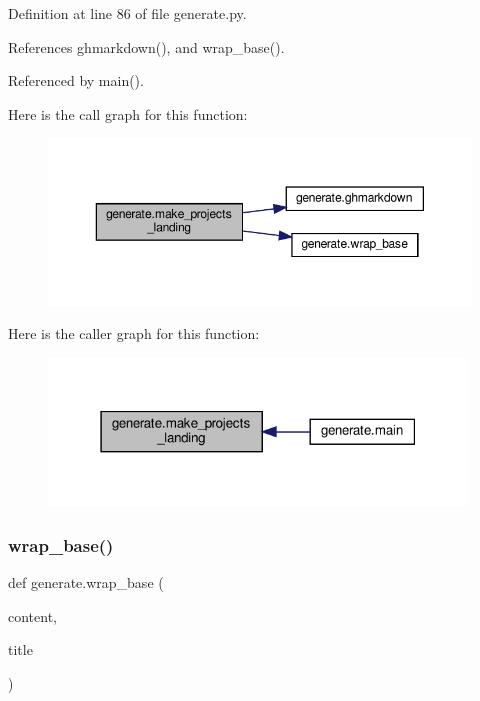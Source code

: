 Definition at line 86 of file generate.\+py.



References ghmarkdown(), and wrap\+\_\+base().



Referenced by main().

Here is the call graph for this function\+:
\nopagebreak
\begin{figure}[H]
\begin{center}
\leavevmode
\includegraphics[width=350pt]{namespacegenerate_a33f954414406a12534e313700841053e_cgraph}
\end{center}
\end{figure}
Here is the caller graph for this function\+:
\nopagebreak
\begin{figure}[H]
\begin{center}
\leavevmode
\includegraphics[width=315pt]{namespacegenerate_a33f954414406a12534e313700841053e_icgraph}
\end{center}
\end{figure}
\mbox{\label{namespacegenerate_adb990cdb948e21150b35af85d236b6be}} 
\subsubsection{\texorpdfstring{wrap\+\_\+base()}{wrap\_base()}}
{\footnotesize\ttfamily def generate.\+wrap\+\_\+base (\begin{DoxyParamCaption}\item[{}]{content,  }\item[{}]{title }\end{DoxyParamCaption})}



